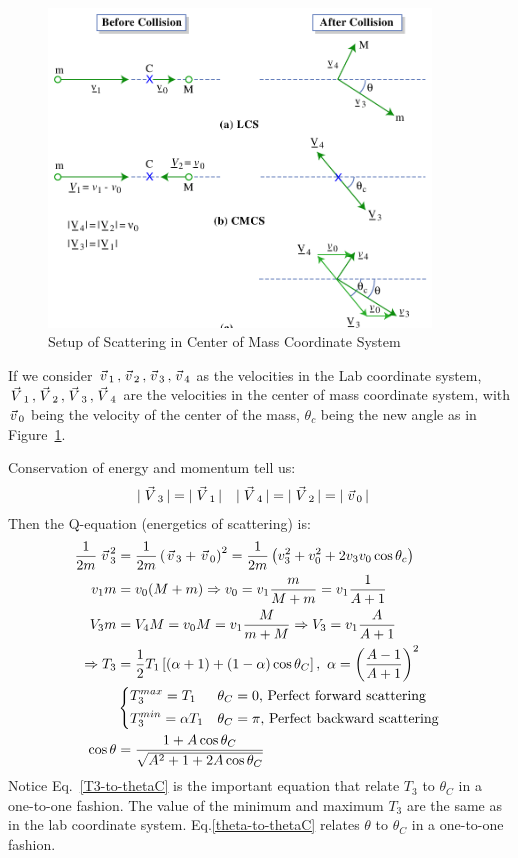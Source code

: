 \documentclass{school-22.101-notes}
\begin{document}
\begin{figure}
    \centering
    \includegraphics[width=4in]{images/ni/setup-CofM.png}
    \caption{Setup of Scattering in Center of Mass Coordinate System\label{setup-CofM}}
\end{figure}
If we consider $\left.\vec{v}\right._1, \left.\vec{v}\right._2, \left.\vec{v}\right._3, \left.\vec{v}\right._4$ as the velocities in the Lab coordinate system, $\left.\vec{V}\right._1, \left.\vec{V}\right._2, \left.\vec{V}\right._3, \left.\vec{V}\right._4$ are the velocities in the center of mass coordinate system, with $\left.\vec{v}\right._0$ being the velocity of the center of the mass, $\theta_c$ being the new angle as in Figure~\ref{setup-CofM}. 

Conservation of energy and momentum tell us: 
\begin{align}
|\left.\vec{V}\right._3| &= |\left.\vec{V}\right._1| & |\left.\vec{V}\right._4| &= |\left.\vec{V}\right._2| = |\left.\vec{v}\right._0| 
\end{align}
Then the Q-equation (energetics of scattering) is: 
\begin{align}
\frac{1}{2m} \vecv_3^2 &= \frac{1}{2m} \left( \vecv_3 + \vecv_0 \right)^2 = \frac{1}{2m} \left( v_3^2 + v_0^2 + 2 v_3 v_0 \cos \theta_c \right) \\
v_1 m &= v_0 (M+m) \Rightarrow v_0 = v_1 \frac{m}{M+m} = v_1 \frac{1}{A+1} \\
V_3 m &= V_4 M = v_0 M = v_1 \frac{M}{m+M} \Rightarrow V_3 = v_1 \frac{A}{A+1} \\
\Rightarrow T_3 &= \frac{1}{2} T_1 \left[ (\alpha+1 ) + (1-\alpha) \cos \theta_C \right], \fsp \alpha = \left( \frac{A-1}{A+1} \right)^2 \label{T3-to-thetaC} \\
&\begin{dcases*}
T_3^{max} = T_1 &  $\theta_C = 0$,  Perfect forward scattering \\
T_3^{min} = \alpha T_1 & $\theta_C = \pi$, Perfect backward scattering 
\end{dcases*}\\
\cos \theta &= \frac{1 + A \cos \theta_C}{\sqrt{A^2 + 1 + 2A \cos \theta_C}} \label{theta-to-thetaC}
\end{align}
Notice Eq.~\ref{T3-to-thetaC} is the important equation that relate $T_3$ to $\theta_C$ in a one-to-one fashion. The value of the minimum and maximum $T_3$ are the same as in the lab coordinate system. Eq.\ref{theta-to-thetaC} relates $\theta$ to $\theta_C$ in a one-to-one fashion. 
\end{document}
